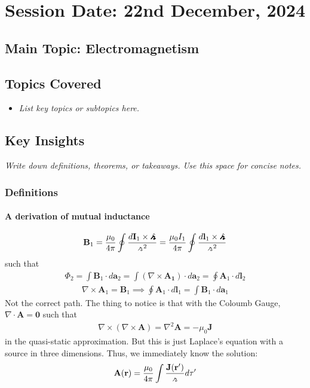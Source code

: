 \section{Session Date: 22nd December, 2024}
\subsection*{Main Topic: Electromagnetism}
\subsection*{Topics Covered}
\begin{itemize}
    \item \textit{List key topics or subtopics here.} 
\end{itemize}

\subsection*{Key Insights}
\textit{Write down definitions, theorems, or takeaways. Use this space for concise notes.}
\subsubsection*{Definitions} 
\paragraph{A derivation of mutual inductance} \begin{align*}
    \mathbf{B}_1 = \frac{\mu_0}{ 4 \pi } \oint \frac{d \mathbf{I}_1 \times \hatgriffr}{\griffr[2]^2} = \frac{\mu_0 I_1}{4 \pi } \oint \frac{d \mathbf{l}_1 \times \hatgriffr }{\griffr[2] ^{2} }
\end{align*}
such that \begin{align*}
    \Phi _2 = \int \mathbf{B}_1 \cdot d \mathbf{a}_2 = \int \left( \nabla \times \mathbf{A_1} \right) \cdot d \mathbf{a}_2 = \oint \mathbf{A}_1 \cdot d \mathbf{l}_2
\end{align*}
\begin{align*}
    \nabla \times \mathbf{A}_1 = \mathbf{B}_1 \implies \oint \mathbf{A}_1 \cdot d \mathbf{l}_1 = \int \mathbf{B}_1 \cdot d \mathbf{a}_1
\end{align*}
Not the correct path. The thing to notice is that with the Coloumb Gauge, \(\nabla \cdot \mathbf{A} = \mathbf{0}\) such that \begin{align*}
    \nabla \times \left( \nabla \times \mathbf{A} \right) = \nabla ^{2} \mathbf{A} = - \mu _0 \mathbf{J}
\end{align*} 
in the quasi-static approximation. But this is just Laplace's equation with a source in three dimensions. Thus, we immediately know the solution: \begin{align*}
    \mathbf{A}(\mathbf{r}) = \frac{\mu _0}{4 \pi } \int \frac{\mathbf{J}(\mathbf{r}^{\prime})}{\griffr[2] } d \tau ^{\prime} 
\end{align*}

